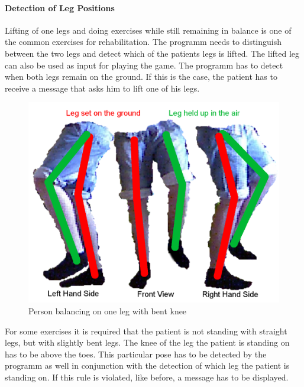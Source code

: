 \paragraph{Detection of Leg Positions}
Lifting of one legs and doing exercises while still remaining in balance is one of the common exercises for rehabilitation. The programm needs to distinguish between the two legs and detect which of the patients legs is lifted. The lifted leg can also be used as input for playing the game. The programm has to detect when both legs remain on the ground. If this is the case, the patient has to receive a message that asks him to lift one of his legs. 
\begin{figure}
\centering
\includegraphics[width=0.7\linewidth]{figures/3-IMR/rehabilitationLegStates}
\caption{Person balancing on one leg with bent knee}
\label{fig:3-IMR:rehabilitationLegStates}
\end{figure}

For some exercises it is required that the patient is not standing with straight legs, but with slightly bent legs. The knee of the leg the patient is standing on has to be above the toes. This particular pose has to be detected by the programm as well in conjunction with the detection of which leg the patient is standing on. If this rule is violated, like before, a message has to be displayed.
